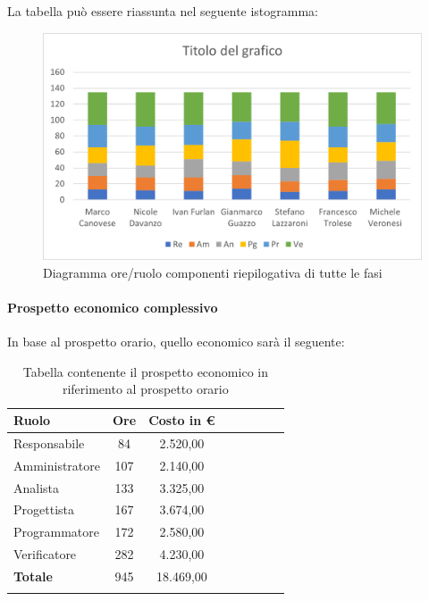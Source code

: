 La tabella può essere riassunta nel seguente istogramma:

\begin{figure}[H]
	\centering
	\includegraphics[width=0.8\linewidth]{res/images/preventivo/tot1.png}
	\caption{Diagramma ore/ruolo componenti riepilogativa di tutte le fasi}
	\label{fig:diagramma suddivisione ruoli riepilogativa di tutte le fasi}
\end{figure}

\paragraph{Prospetto economico complessivo}
In base al prospetto orario, quello economico sarà il seguente:

\begin{longtable}{|l|c|c|c|c|c|c|c|}
	\hline
	\rowcolor{lighter-grayer}
	\textbf{Ruolo}  & \textbf{Ore} & \textbf{Costo in €} \\
	\hline
	\endfirsthead

	\hline
	Responsabile    & 84           & 2.520,00            \\
	\hline
	\hline
	Amministratore  & 107          & 2.140,00            \\
	\hline
	\hline
	Analista        & 133          & 3.325,00            \\
	\hline
	\hline
	Progettista     & 167          & 3.674,00            \\
	\hline
	\hline
	Programmatore   & 172          & 2.580,00            \\
	\hline
	\hline
	Verificatore    & 282          & 4.230,00            \\
	\hline
	\hline
	\textbf{Totale} & 945          & 18.469,00           \\
	\hline
	\rowcolor{white}
	\caption{Tabella contenente il prospetto economico in riferimento al prospetto orario}
\end{longtable}
\pagebreak

